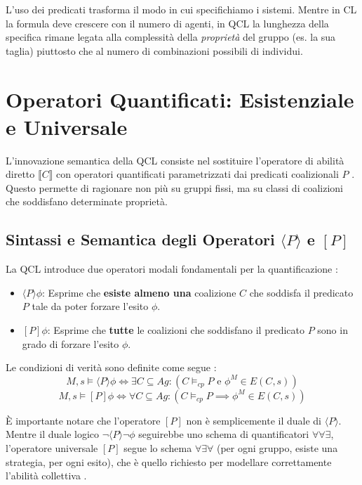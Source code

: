 \documentclass[12pt]{article}
\newcommand{\CL}[1]{\llbracket #1 \rrbracket}
\begin{document}
L'uso dei predicati trasforma il modo in cui specifichiamo i sistemi. Mentre in
CL la formula deve crescere con il numero di agenti, in QCL la lunghezza della
specifica rimane legata alla complessità della \textit{proprietà} del gruppo
(es. la sua taglia) piuttosto che al numero di combinazioni possibili di
individui.
\section{Operatori Quantificati: Esistenziale e Universale}

L'innovazione semantica della QCL consiste nel sostituire l'operatore di abilità
diretto $\CL{C}$ con operatori quantificati parametrizzati dai predicati
coalizionali $P$ . Questo permette di ragionare non più su gruppi
fissi, ma su classi di coalizioni che soddisfano determinate proprietà.

\subsection{Sintassi e Semantica degli Operatori $\langle P \rangle$ e $[P]$}

La QCL introduce due operatori modali fondamentali per la quantificazione
:
\begin{itemize}
	\item $\langle P \rangle \phi$: Esprime che \textbf{esiste almeno una}
	      coalizione $C$ che soddisfa il predicato $P$ tale da poter forzare l'esito $\phi$.
	\item $[P] \phi$: Esprime che \textbf{tutte} le coalizioni che soddisfano
	      il predicato $P$ sono in grado di forzare l'esito $\phi$.
\end{itemize}

Le condizioni di verità sono definite come segue :
\begin{equation}
	M, s \models \langle P \rangle \phi \iff \exists C \subseteq Ag : (C \models_{cp} P \text{ e } \phi^M \in E(C, s))
\end{equation}
\begin{equation}
	M, s \models [P] \phi \iff \forall C \subseteq Ag : (C \models_{cp} P \implies \phi^M \in E(C, s))
\end{equation}

È importante notare che l'operatore $[P]$ non è semplicemente il duale di
$\langle P \rangle$. Mentre il duale logico $\neg \langle P \rangle \neg \phi$
seguirebbe uno schema di quantificatori $\forall \forall \exists$, l'operatore
universale $[P]$ segue lo schema $\forall \exists \forall$ (per ogni gruppo,
esiste una strategia, per ogni esito), che è quello richiesto per modellare
correttamente l'abilità collettiva .
\end{document}
